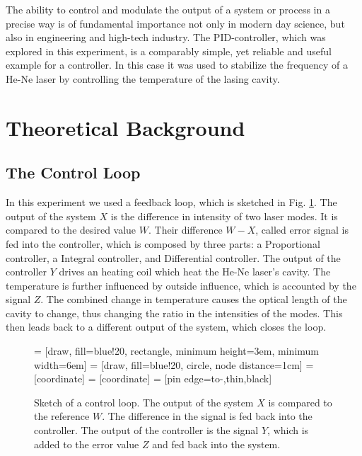 \documentclass[a4paper,10pt]{article}
\begin{document}
The ability to control and modulate the output of a system or process in a precise way is of fundamental importance not only in modern day science, but also in engineering and high-tech industry. The PID-controller, which was explored in this experiment, is a comparably simple, yet reliable and useful example for a controller. In this case it was used to stabilize the frequency of a He-Ne laser by controlling the temperature of the lasing cavity.

\section{Theoretical Background}
\label{theory}
\subsection{The Control Loop}
In this experiment we used a feedback loop, which is sketched in Fig. \ref{fig_control_loop}. The output of the system $X$ is the difference in intensity of two laser modes. It is compared to the desired value $W$. Their difference $W-X$, called error signal is fed into the controller, which is composed by three parts: a Proportional controller, a Integral controller, and Differential controller. The output of the controller $Y$ drives an heating coil which heat the He-Ne laser's cavity. The temperature is further influenced by outside influence, which is accounted by the signal $Z$. The combined change in temperature causes the optical length of the cavity to change, thus changing the ratio in the intensities of the modes. This then leads back to a different output of the system, which closes the loop.
\begin{figure}[htp!]
    \centering
     = [draw, fill=blue!20, rectangle,
    minimum height=3em, minimum width=6em]
     = [draw, fill=blue!20, circle, node distance=1cm]
     = [coordinate]
     = [coordinate]
     = [pin edge={to-,thin,black}]

\caption{Sketch of a control loop. The output of the system $X$ is compared to the reference $W$. The difference in the signal is fed back into the controller. The output of the controller is the signal $Y$, which is added to the error value $Z$ and fed back into the system. }
\label{fig_control_loop}
\end{figure}
\end{document}
